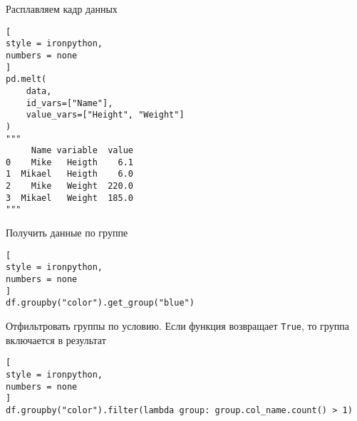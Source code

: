 \documentclass[%
	11pt,
	a4paper,
	utf8,
		]{article}
\begin{document}
Расплавляем кадр данных
\begin{lstlisting}[
style = ironpython,
numbers = none
]
pd.melt(
    data,
    id_vars=["Name"],
    value_vars=["Height", "Weight"]
)
"""
     Name variable  value
0    Mike   Heigth    6.1
1  Mikael   Heigth    6.0
2    Mike   Weight  220.0
3  Mikael   Weight  185.0
"""
\end{lstlisting}

Получить данные по группе
\begin{lstlisting}[
style = ironpython,
numbers = none
]
df.groupby("color").get_group("blue")
\end{lstlisting}

Отфильтровать группы по условию. Если функция возвращает \texttt{True}, то группа включается в результат
\begin{lstlisting}[
style = ironpython,
numbers = none
]
df.groupby("color").filter(lambda group: group.col_name.count() > 1)
\end{lstlisting}



\begin{thebibliography}{99}
	
	
	
\end{thebibliography}


\end{document}
